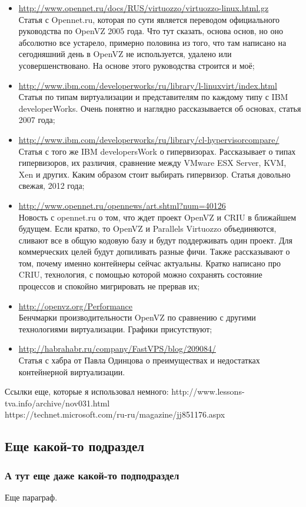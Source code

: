 \begin{itemize}
    \item \url{http://www.opennet.ru/docs/RUS/virtuozzo/virtuozzo-linux.html.gz} \\
    Статья с Opennet.ru, которая по сути является переводом официального руководства по OpenVZ 2005 года.
    Что тут сказать, основа основ, но оно абсолютно все устарело, примерно половина из того, что там написано на сегодняшний день в OpenVZ не используется, удалено или усовершенствовано.
    На основе этого руководства строится и моё;
    \item \url{http://www.ibm.com/developerworks/ru/library/l-linuxvirt/index.html} \\
    Статья по типам виртуализации и представителям по каждому типу с IBM developerWorks.
    Очень понятно и наглядно рассказывается об основах, статья 2007 года;
    \item \url{http://www.ibm.com/developerworks/ru/library/cl-hypervisorcompare/} \\
    Статья с того же IBM developersWork о гипервизорах.
    Рассказывает о типах гипервизоров, их различия, сравнение между VMware ESX Server, KVM, Xen и других.
    Каким образом стоит выбирать гипервизор.
    Статья довольно свежая, 2012 года;
    \item \url{http://www.opennet.ru/opennews/art.shtml?num=40126} \\
    Новость с opennet.ru о том, что ждет проект OpenVZ и CRIU в ближайшем будущем.
    Если кратко, то OpenVZ и Parallels Virtuozzo объединяются, сливают все в общую кодовую базу и будут поддерживать один проект.
    Для коммерческих целей будут допиливать разные фичи.
    Также рассказывают о том, почему именно контейнеры сейчас актуальны.
    Кратко написано про CRIU, технология, с помощью которой можно сохранять состояние процессов и спокойно мигрировать не прервав их;
    \item \url{http://openvz.org/Performance} \\
    Бенчмарки производительности OpenVZ по сравнению с другими технологиями виртуализации.
    Графики присутствуют;
    \item \url{http://habrahabr.ru/company/FastVPS/blog/209084/} \\
    Статья с хабра от Павла Одинцова о преимуществах и недостатках контейнерной виртуализации.
\end{itemize}

Ссылки еще, которые я использовал немного:
http://www.lessons-tva.info/archive/nov031.html \\
https://technet.microsoft.com/ru-ru/magazine/jj851176.aspx \\


\subsection{Еще какой-то подраздел}

\subsubsection{А тут еще даже какой-то подподраздел}

Еще параграф.

\clearpage

